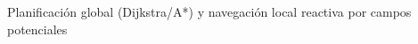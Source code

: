 \documentclass[12pt]{article}
\begin{document}
%
        {Planificaci\'{o}n global (Dijkstra/A*) y navegaci\'{o}n local reactiva por campos potenciales}

\tableofcontents
\clearpage


\end{document}
